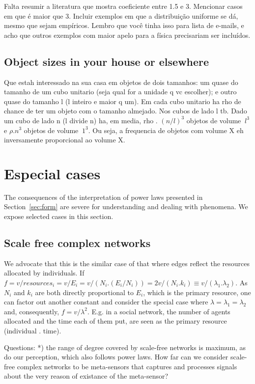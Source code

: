 \documentclass[a4paper, 11pt]{article} %
\begin{document}
Falta resumir a literatura que mostra coeficiente entre 1.5 e 3. Mencionar casos em que é maior que 3.
Incluir exemplos em que a distribuição uniforme se dá, mesmo que sejam empíricos. Lembro que você tinha isso para lista de e-mails, e acho que outros exemplos com maior apelo para a física precisariam ser incluídos.


\subsection{Object sizes in your house or elsewhere}

Que estah interessado na sua casa em objetos de dois tamanhos: um quase do tamanho de um cubo unitario (seja qual for a unidade q vc escolher); e outro quase do tamanho l (l inteiro e maior q um). Em cada cubo unitario ha rho de chance de ter um objeto com o tamanho almejado. Nos cubos  de lado l tb. Dado um cubo de lado n (l divide n) ha, em media, rho . $(n/l)^3$ objetos de volume $~l^3$ e $\rho . n^3$ objetos de volume $~1^3$. Ou seja, a frequencia de objetos com volume X eh inversamente proporcional ao volume X.
\section{Especial cases}
The consequences of the
interpretation of power laws presented in Section~\ref{sec:form}
are severe for understanding and dealing with
phenomena. We expose selected cases in this section.


\subsection{Scale free complex networks}
We advocate that this is the similar case of that where edges reflect the resources allocated by individuals. If $f=v/resources_i=v/E_i=v/(N_i . (E_i/N_i))=2v/(N_i . k_i) \equiv v / (\lambda_1 .   \lambda_2)$. As $N_i$ and $k_i$ are both directly proportional to $E_i$, which is the primary resource, one can factor out another constant and consider the special case where $\lambda=\lambda_1=\lambda_2$ and, consequently, $f=v/\lambda^2$. E.g. in a social network, the number of agents allocated and the time each of them put, are seen as the primary resource (individual . time).

Questions:
*) the range of degree covered by scale-free networks is maximum, as do our perception, which also follows power laws. How far can we consider scale-free complex networks to be meta-sensors that captures and processes signals about the very reason of existance of the meta-sensor?
\end{document}
